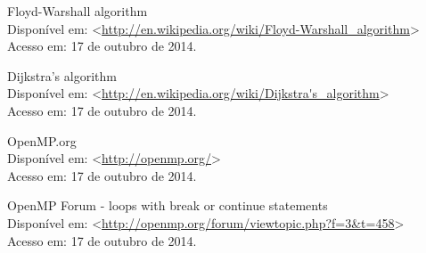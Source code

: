 \newpage

\begin{thebibliography}{9}

		Floyd-Warshall algorithm\\
		Disponível em: \textless\url{http://en.wikipedia.org/wiki/Floyd-Warshall_algorithm}\textgreater\\
		Acesso em: 17 de outubro de 2014.

		Dijkstra's algorithm\\
		Disponível em: \textless\url{http://en.wikipedia.org/wiki/Dijkstra's_algorithm}\textgreater\\
		Acesso em: 17 de outubro de 2014.

		OpenMP.org\\
		Disponível em: \textless\url{http://openmp.org/}\textgreater\\
		Acesso em: 17 de outubro de 2014.

		OpenMP Forum - loops with break or continue statements\\
		Disponível em: \textless\url{http://openmp.org/forum/viewtopic.php?f=3&t=458}\textgreater\\
		Acesso em: 17 de outubro de 2014.
		
\end{thebibliography}
